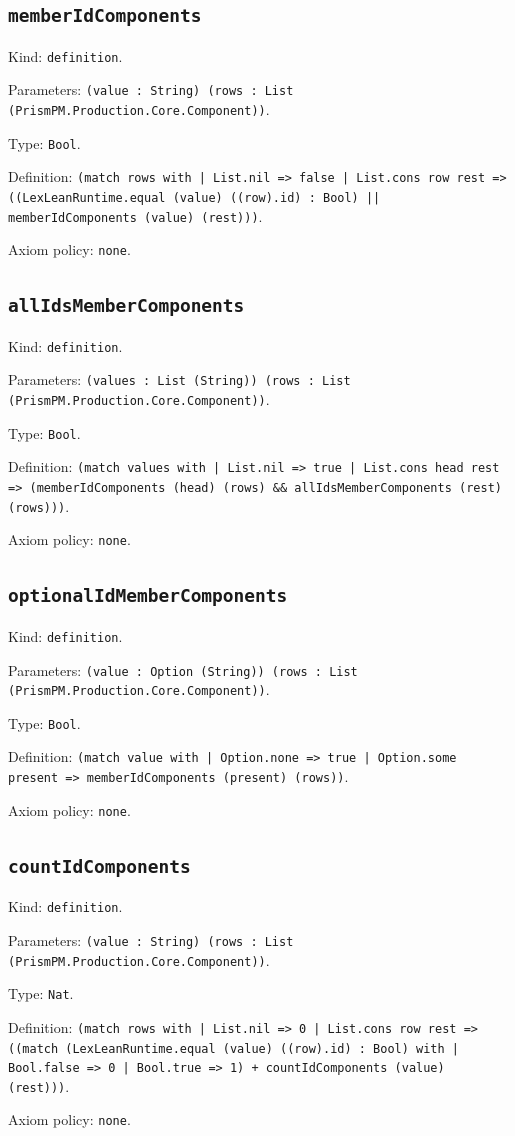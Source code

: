 \documentclass[11pt]{article}
\begin{document}
\subsection*{\texttt{memberIdComponents}}
\noindent Kind: \texttt{definition}.\par
\noindent Parameters: \texttt{(value : String) (rows : List (PrismPM.Production.Core.Component))}.\par
\noindent Type: \texttt{Bool}.\par
\noindent Definition: \texttt{(match rows with | List.nil => false | List.cons row rest => ((LexLeanRuntime.equal (value) ((row).id) : Bool) || memberIdComponents (value) (rest)))}.\par
\noindent Axiom policy: \texttt{none}.\par
\subsection*{\texttt{allIdsMemberComponents}}
\noindent Kind: \texttt{definition}.\par
\noindent Parameters: \texttt{(values : List (String)) (rows : List (PrismPM.Production.Core.Component))}.\par
\noindent Type: \texttt{Bool}.\par
\noindent Definition: \texttt{(match values with | List.nil => true | List.cons head rest => (memberIdComponents (head) (rows) \&\& allIdsMemberComponents (rest) (rows)))}.\par
\noindent Axiom policy: \texttt{none}.\par
\subsection*{\texttt{optionalIdMemberComponents}}
\noindent Kind: \texttt{definition}.\par
\noindent Parameters: \texttt{(value : Option (String)) (rows : List (PrismPM.Production.Core.Component))}.\par
\noindent Type: \texttt{Bool}.\par
\noindent Definition: \texttt{(match value with | Option.none => true | Option.some present => memberIdComponents (present) (rows))}.\par
\noindent Axiom policy: \texttt{none}.\par
\subsection*{\texttt{countIdComponents}}
\noindent Kind: \texttt{definition}.\par
\noindent Parameters: \texttt{(value : String) (rows : List (PrismPM.Production.Core.Component))}.\par
\noindent Type: \texttt{Nat}.\par
\noindent Definition: \texttt{(match rows with | List.nil => 0 | List.cons row rest => ((match (LexLeanRuntime.equal (value) ((row).id) : Bool) with | Bool.false => 0 | Bool.true => 1) + countIdComponents (value) (rest)))}.\par
\noindent Axiom policy: \texttt{none}.\par
\end{document}
